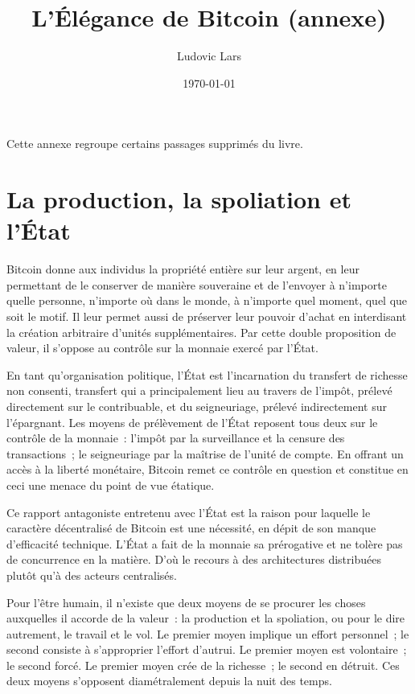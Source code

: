 \documentclass[a4paper,notitlepage]{article}
\title{L'Élégance de Bitcoin (annexe)}     %
\author{Ludovic Lars}                       %
\date{\today}                               %
\begin{document}
\setlength\parindent{0pt} %

\maketitle

Cette annexe regroupe certains passages supprimés du livre.

\section{La production, la spoliation et l'État}

Bitcoin donne aux individus la propriété entière sur leur argent, en leur permettant de le conserver de manière souveraine et de l'envoyer à n'importe quelle personne, n'importe où dans le monde, à n'importe quel moment, quel que soit le motif. Il leur permet aussi de préserver leur pouvoir d'achat en interdisant la création arbitraire d'unités supplémentaires. Par cette double proposition de valeur, il s'oppose au contrôle sur la monnaie exercé par l'État.

En tant qu'organisation politique, l'État est l'incarnation du transfert de richesse non consenti, transfert qui a principalement lieu au travers de l'impôt, prélevé directement sur le contribuable, et du seigneuriage, prélevé indirectement sur l'épargnant. Les moyens de prélèvement de l'État reposent tous deux sur le contrôle de la monnaie~: l'impôt par la surveillance et la censure des transactions~; le seigneuriage par la maîtrise de l'unité de compte. En offrant un accès à la liberté monétaire, Bitcoin remet ce contrôle en question et constitue en ceci une menace du point de vue étatique.

Ce rapport antagoniste entretenu avec l'État est la raison pour laquelle le caractère décentralisé de Bitcoin est une nécessité, en dépit de son manque d'efficacité technique. L'État a fait de la monnaie sa prérogative et ne tolère pas de concurrence en la matière. D'où le recours à des architectures distribuées plutôt qu'à des acteurs centralisés.

Pour l'être humain, il n'existe que deux moyens de se procurer les choses auxquelles il accorde de la valeur~: la production et la spoliation, ou pour le dire autrement, le travail et le vol. Le premier moyen implique un effort personnel~; le second consiste à s'approprier l'effort d'autrui. Le premier moyen est volontaire~; le second forcé. Le premier moyen crée de la richesse~; le second en détruit. Ces deux moyens s'opposent diamétralement depuis la nuit des temps.
\end{document}
